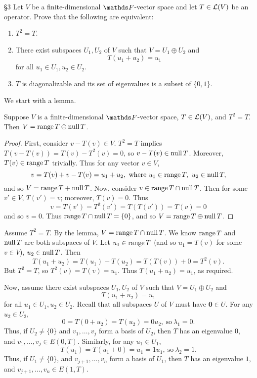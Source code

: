 \documentclass{homework}
\begin{document}
\begin{problem}{\S 3}
  Let $V$ be a finite-dimensional $\F$-vector space and let $T\in \mathcal{L}(V)$ be an operator. Prove
  that the following are equivalent:
  \begin{enumerate}[label=(\alph*)]
    \item $T^2=T$.
    \item There exist subspaces $U_1,U_2$ of $V$ such that $V=U_1\oplus U_2$ and \[
        T(u_1+u_2)=u_1
      \] for all $u_1\in U_1,u_2\in U_2$.
    \item $T$ is diagonalizable and its set of eigenvalues is a subset of $\{ 0,1 \}$.
  \end{enumerate}
\end{problem}
\begin{solution}
  We start with a lemma.
  \begin{lemma}{}
    Suppose $V$ is a finite-dimensional $\F$-vector space, $T\in \mathcal{L}(V)$, and $T^2=T$. Then
    $V=\operatorname{range}{T}\oplus\operatorname{null}{T}$.
  \end{lemma}
  \begin{proof}[Proof]
    First, consider $v-T(v)\in V$. $T^2=T$ implies $T(v-T(v))=T(v)-T^2(v)=0$, so $v-T(v)\in
    \operatorname{null}{T}$. Moreover, $T(v)\in \operatorname{range}{T}$ trivially. Thus for any vector $v\in V$, \[
      v=T(v)+v-T(v)=u_1+u_2, ~\text{where}~u_1\in \operatorname{range}{T},\ u_2\in \operatorname{null}{T}
    ,\] and so $V=\operatorname{range}{T}+\operatorname{null}{T}$. Now, consider $v\in \operatorname{range}{T}\cap \operatorname{null}{T}$. Then for some
    $v'\in V$, $T(v')=v$; moreover, $T(v)=0$. Thus \[
      v=T(v')=T^2(v')=T(T(v'))=T(v)=0
    \] and so $v=0$. Thus $\operatorname{range}{T}\cap \operatorname{null}{T}=\{ 0 \}$, and so $V=\operatorname{range}{T}\oplus\operatorname{null}{T}$.
  \end{proof}

  Assume $T^2=T$. By the lemma, $V=\operatorname{range}{T}\cap \operatorname{null}{T}$. We know $\operatorname{range}{T}$ and $\operatorname{null}{T}$ are
  both subspaces of $V$. Let $u_1\in \operatorname{range}{T}$ (and so $u_1=T(v)$ for some $v\in V$), $u_2\in
  \operatorname{null}{T}$. Then \[
    T(u_1+u_2)=T(u_1)+T(u_2)=T(T(v))+0=T^2(v)
  .\] But $T^2=T$, so $T^2(v)=T(v)=u_1$. Thus $T(u_1+u_2)=u_1$, as required.

  Now, assume there exist subspaces $U_1,U_2$ of $V$ such that $V=U_1\oplus U_2 $ and \[
    T(u_1+u_2)=u_1
  \] for all $u_1\in U_1,u_2\in U_2$. Recall that all subspaces $U$ of $V$ must have $\textbf{0}\in
  U$. For any $u_2\in U_2$, \[
    0=T(0+u_2)=T(u_2)=0u_2, ~\text{so}~\lambda_1=0
  .\] Thus, if $U_2\neq \{ 0 \}$ and $v_1,\ldots,v_j$ form a basis of $U_2$, then $T$ has an
  eigenvalue $0$, and $v_1,\ldots,v_j\in E(0,T)$. Similarly, for any $u_1\in U_1$, \[
    T(u_1)=T(u_1+0)=u_1=1u_1, ~\text{so}~\lambda_2=1
  .\] Thus, if $U_1\neq \{ 0 \}$, and $v_{j+1},\ldots,v_n$ form a basis of $U_1$, then $T$ has an
  eigenvalue $1$, and $v_{j+1},\ldots,v_n\in E(1,T)$.


\end{solution}
\end{document}
